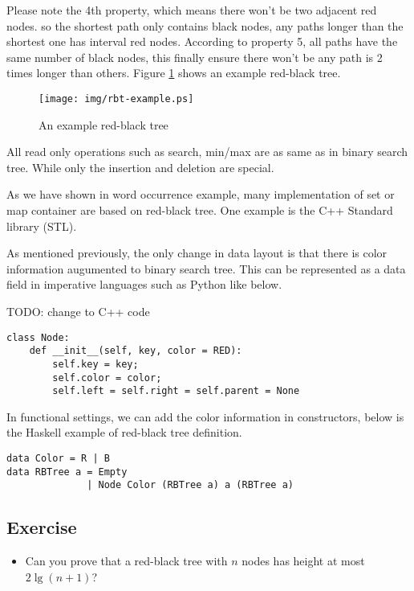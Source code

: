 \documentclass{article}
\begin{document}
Please note the 4th property, which means there won't be two adjacent 
red nodes. so the shortest path only contains black nodes, any paths 
longer than the shortest one has interval red nodes. According to 
property 5, all paths have the same number of black nodes, 
this finally ensure there won't be any path is 2 times longer than 
others\cite{wiki}. Figure \ref{fig:rbt-example} shows an example
red-black tree.

\begin{figure}[htbp]
       \begin{center}
	\texttt{[image: img/rbt-example.ps]}
        \caption{An example red-black tree} \label{fig:rbt-example}
       \end{center}
\end{figure}

All read only operations such as search, min/max are as same as in 
binary search tree. While only the insertion and deletion are special.

As we have shown in word occurrence example, many implementation of 
set or map container are based on red-black tree. One example is the 
C++ Standard library (STL)\cite{sgi-stl}. 

As mentioned previously, the only change in data layout is that
there is color information augumented to binary search tree.
This can be represented as a data field in imperative languages
such as Python like below.

TODO: change to C++ code

\lstset{language=Python}
\begin{lstlisting}
class Node:
    def __init__(self, key, color = RED):
        self.key = key;
        self.color = color;
        self.left = self.right = self.parent = None
\end{lstlisting}

In functional settings, we can add the color information
in constructors, below is the Haskell example of red-black tree
definition.

\lstset{language=Haskell}
\begin{lstlisting}
data Color = R | B
data RBTree a = Empty
              | Node Color (RBTree a) a (RBTree a)
\end{lstlisting}

\subsection*{Exercise}

\begin{itemize}
\item Can you prove that a red-black tree with $n$ nodes has
height at most $2 \lg (n+1)$?
\end{itemize}
\end{document}
